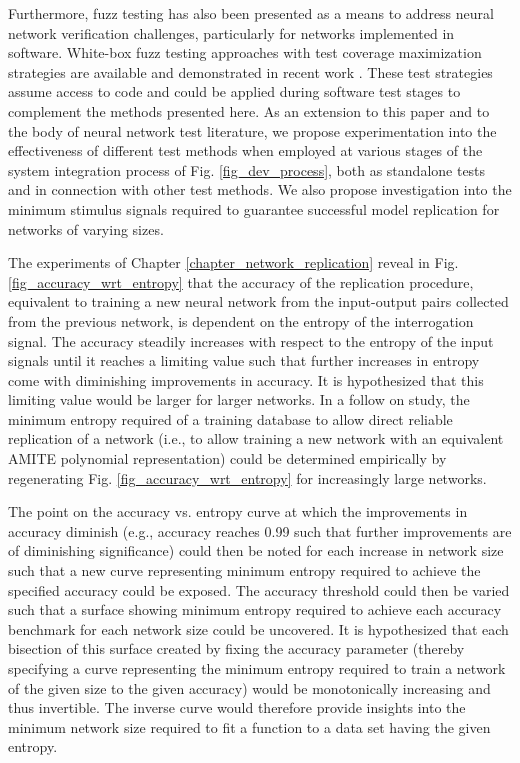 Furthermore, fuzz testing has also been presented as a means to address neural network verification challenges, particularly for networks implemented in software.  White-box fuzz testing approaches with test coverage maximization strategies are available and demonstrated in recent work \cite{pei_deepxplore_2017,guo_dlfuzz_2018,odena_tensorfuzz_2019,liang_deepfuzzer_2019}.  These test strategies assume access to code and could be applied during software test stages to complement the methods presented here.  As an extension to this paper and to the body of neural network test literature, we propose experimentation into the effectiveness of different test methods when employed at various stages of the system integration process of Fig. \ref{fig_dev_process}, both as standalone tests and in connection with other test methods.  We also propose investigation into the minimum stimulus signals required to guarantee successful model replication for networks of varying sizes.

The experiments of Chapter \ref{chapter_network_replication} reveal in Fig. \ref{fig_accuracy_wrt_entropy} that the accuracy of the replication procedure, equivalent to training a new neural network from the input-output pairs collected from the previous network, is dependent on the entropy of the interrogation signal.  The accuracy steadily increases with respect to the entropy of the input signals until it reaches a limiting value such that further increases in entropy come with diminishing improvements in accuracy.  It is hypothesized that this limiting value would be larger for larger networks.  In a follow on study, the minimum entropy required of a training database to allow direct reliable replication of a network (i.e., to allow training a new network with an equivalent AMITE polynomial representation) could be determined empirically by regenerating Fig. \ref{fig_accuracy_wrt_entropy} for increasingly large networks.

The point on the accuracy vs. entropy curve at which the improvements in accuracy diminish (e.g., accuracy reaches 0.99 such that further improvements are of diminishing significance) could then be noted for each increase in network size such that a new curve representing minimum entropy required to achieve the specified accuracy could be exposed.  The accuracy threshold could then be varied such that a surface showing minimum entropy required to achieve each accuracy benchmark for each network size could be uncovered.  It is hypothesized that each bisection of this surface created by fixing the accuracy parameter (thereby specifying a curve representing the minimum entropy required to train a network of the given size to the given accuracy) would be monotonically increasing and thus invertible.  The inverse curve would therefore provide insights into the minimum network size required to fit a function to a data set having the given entropy.

